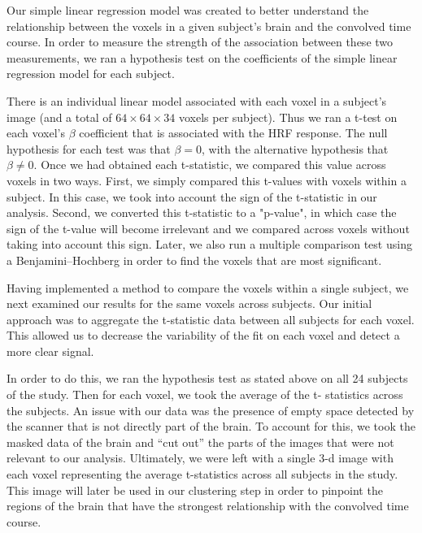 \par \indent Our simple linear regression model was created to better 
understand the relationship between the voxels in a given subject's brain and 
the convolved time course. In order to measure the strength of the association 
between these two measurements, we ran a hypothesis test on the coefficients of 
the simple linear regression model for each subject. 

\par There is an individual linear model associated with each voxel in a
subject’s image (and a total of $64 \times 64 \times 34$ voxels per subject).
Thus we ran a t-test on each voxel's $\beta$ coefficient that is associated
with the HRF response. The null hypothesis for each test was that $ \beta = 0$,
with the alternative hypothesis that $\beta \neq 0$. Once we had obtained each
t-statistic, we compared this value across voxels in two ways. First, we simply
compared this t-values with voxels within a subject. In this case, we took into
account the sign of the t-statistic in our analysis. Second, we converted this
t-statistic to a "p-value", in which case the sign of the t-value will become
irrelevant and we compared across voxels without taking into account this sign.
Later, we also run a multiple comparison test using a Benjamini–Hochberg in
order to find the voxels that are most significant.


\par Having implemented a method to compare the voxels within a single subject, 
we next examined our results for the same voxels across subjects. Our initial 
approach was to aggregate the t-statistic data between all subjects for each 
voxel. This allowed us to decrease the variability of the fit on each voxel and 
detect a more clear signal. 

\par In order to do this, we ran the hypothesis test as stated above on all 24 
subjects of the study. Then for each voxel, we took the average of the t-
statistics across the subjects. An issue with our data was the presence of 
empty space detected by the scanner that is not directly part of the brain. To 
account for this, we took the masked data of the brain and ``cut out'' the parts 
of the images that were not relevant to our analysis. Ultimately, we were left with 
a single 3-d image with each voxel representing the average t-statistics across 
all subjects in the study. This image will later be used in our clustering step in 
order to pinpoint the regions of the brain that have the strongest relationship 
with the convolved time course. 
